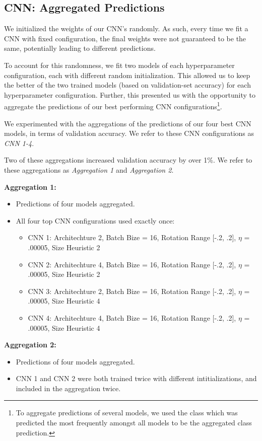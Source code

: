 \documentclass[letterpaper, 10 pt, conference]{ieeeconf}  %
\begin{document}
\subsection{CNN: Aggregated Predictions} 

We initialized the weights of our CNN's randomly. As such, every time we fit a CNN with fixed configuration, the final weights were not guaranteed to be the same, potentially leading to different predictions. 

To account for this randomness, we fit two models of each hyperparameter configuration, each with different random initialization. This allowed us to keep the better of the two trained models (based on validation-set accuracy) for each hyperparameter configuration. Further, this presented us with the opportunity to aggregate the predictions of our best performing CNN configurations\footnote{To aggregate predictions of several models, we used the class which was predicted the most frequently amongst all models to be the aggregated class prediction.}.

We experimented with the aggregations of the predictions of our four best CNN models, in terms of validation accuracy. We refer to these CNN configurations as \emph{CNN 1-4}. 

Two of these aggregations increased validation accuracy by over 1\%. We refer to these aggregations as \emph{Aggregation 1} and \emph{Aggregation 2}. 

\textbf{Aggregation 1:}
\begin{itemize}
\item Predictions of four models aggregated.
\item All four top CNN configurations used exactly once:
	\begin{itemize}
    \item CNN 1: Architechture 2, Batch Bize = 16, Rotation Range [-.2, .2], $\eta$ = .00005, Size Heuristic 2
	\item CNN 2: Architechture 4, Batch Bize = 16, Rotation Range [-.2, .2], $\eta$ = .00005, Size Heuristic 2
	\item CNN 3: Architechture 2, Batch Bize = 16, Rotation Range [-.2, .2], $\eta$ = .00005, Size Heuristic 4
	\item CNN 4: Architechture 4, Batch Bize = 16, Rotation Range [-.2, .2], $\eta$ = .00005, Size Heuristic 4
	\end{itemize}
\end{itemize}
\textbf{Aggregation 2:}
\begin{itemize}
\item Predictions of four models aggregated.
\item CNN 1 and CNN 2 were both trained twice with different intitializations, and included in the aggregation twice.
\end{itemize}
\end{document}
